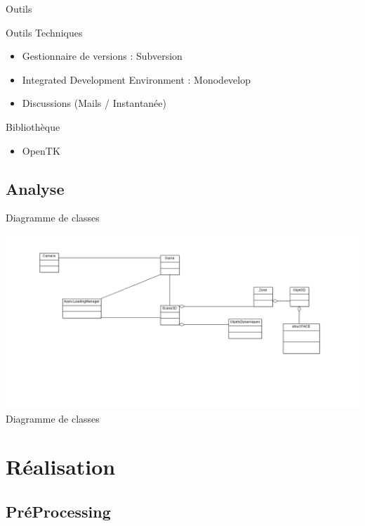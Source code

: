 \documentclass{beamer}
\begin{document}
		\begin{frame}{Outils}
			\begin{alertblock}{Outils Techniques}
				\begin{itemize}
					\item Gestionnaire de versions : Subversion
					\item Integrated Development Environment : Monodevelop
					\item Discussions (Mails / Instantanée)
				\end{itemize}
			\end{alertblock}
			 \pause
			\begin{exampleblock}{Bibliothèque}
				\begin{itemize}
					\item OpenTK
				\end{itemize}
			\end{exampleblock}
		\end{frame}
	
	\subsection{Analyse}
		\begin{frame}{Diagramme de classes}
			\begin{center}
				\includegraphics[scale=0.3]{Rapport/images/ClassDiagram.png} \\
				\tiny{Diagramme de classes\\} 
			\end{center}
		\end{frame}

	\section{Réalisation}
		\subsection{PréProcessing}
			
\end{document}

